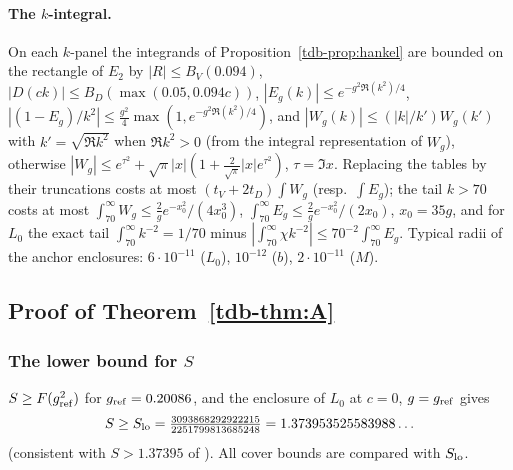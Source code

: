 \paragraph{The $k$-integral.} On each $k$-panel the integrands of Proposition~\ref{tdb-prop:hankel} are bounded on the rectangle of $E_2$ by
$|R|\le B_V(0.094)$, $|D(ck)|\le B_D(\max(0.05,0.094c))$, $|E_g(k)|\le e^{-g^2\Re(k^2)/4}$, $|(1-E_g)/k^2|\le\frac{g^2}4\max(1,e^{-g^2\Re(k^2)/4})$, and
$|W_g(k)|\le(|k|/k')W_g(k')$ with $k'=\sqrt{\Re k^2}$ when $\Re k^2>0$ (from the integral representation of $W_g$), otherwise
$|W_g|\le e^{\tau^2}+\sqrt\pi|x|(1+\frac2{\sqrt\pi}|x|e^{\tau^2})$, $\tau=\Im x$. Replacing the tables by their truncations costs at most
$(t_V+2t_D)\int W_g$ (resp.\ $\int E_g$); the tail $k>70$ costs at most $\int_{70}^\infty W_g\le\frac2ge^{-x_0^2}/(4x_0^3)$,
$\int_{70}^\infty E_g\le\frac2ge^{-x_0^2}/(2x_0)$, $x_0=35g$, and for $L_0$ the exact tail $\int_{70}^\infty k^{-2}=1/70$ minus
$|\int_{70}^\infty\chi k^{-2}|\le70^{-2}\int_{70}^\infty E_g$. Typical radii of the anchor enclosures: $6\cdot10^{-11}$ ($L_0$), $10^{-12}$ ($b$),
$2\cdot10^{-11}$ ($M$).

\subsection{Proof of Theorem~\ref{tdb-thm:A}}\label{tdb-sec:cover}

\subsubsection{The lower bound for $S$}
$S\ge F(g_{\rm ref}^2)$ for $g_{\rm ref}=0.20086$, and the enclosure of $L_0$ at $c=0$, $g=g_{\rm ref}$ gives
\[
S\ge S_{\rm lo}=\tfrac{3093868292922215}{2251799813685248}=1.373953525583988\ldots
\]
(consistent with $S>1.37395$ of \Sd). All cover bounds are compared with $S_{\rm lo}$.

